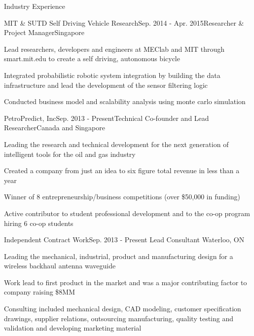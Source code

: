 \documentclass{resume} %
\begin{document}
\begin{rSection}{Industry Experience}

\begin{rSubsection}{MIT \& SUTD Self Driving Vehicle Research}{Sep. 2014 - Apr. 2015}{Researcher \& Project Manager}{Singapore}

\item Lead researchers, developers and engineers at MEClab and MIT through smart.mit.edu to create a self driving, autonomous bicycle
\item Integrated probabilistic robotic system integration by building the data infrastructure  and lead the development of the sensor filtering logic
\item Conducted business model and scalability analysis using monte carlo simulation
\end{rSubsection}


\begin{rSubsection}{PetroPredict, Inc}{Sep. 2013 - Present}{Technical Co-founder and Lead Researcher}{Canada and Singapore}
\item Leading the research and technical development for the next generation of intelligent tools for the oil and gas industry
\item Created a company from just an idea to six figure total revenue in less than a year
\item Winner of 8 entrepreneurship/business competitions (over \$50,000 in funding)
\item Active contributor to student professional development and to the co-op program hiring 6 co-op students
\end{rSubsection}

\begin{rSubsection}{ Independent Contract Work}{Sep. 2013 - Present }{Lead Consultant }{Waterloo, ON}
\item Leading the mechanical, industrial, product and manufacturing design for a wireless backhaul antenna waveguide
\item Work lead to first product in the market and was a major contributing factor to company raising \$8MM
\item Consulting included mechanical design, CAD modeling, customer specification drawings, supplier relations, outsourcing manufacturing, quality testing and validation and developing marketing material
\end{rSubsection}



\end{rSection}
\end{document}
